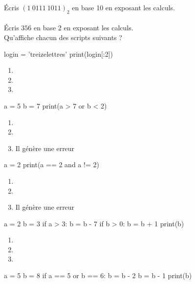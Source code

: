 \documentclass[a4paper,10pt]{article}
\begin{document}
\'Ecris $(1\ 0111\ 1011)_2$ en base 10 en exposant les calculs.\\

\\

\'Ecris $356$ en base 2 en exposant les calculs.\\

\newpage
Qu'affiche chacun des scripts suivants ?\\
\begin{multicols}{2}
\begin{pythoncode}
login = 'treizelettres'
print(login[:2])
\end{pythoncode}
\begin{enumerate}[\case\ \ a.]
\item {}
\item {}
\item {}
\end{enumerate}

\begin{pythoncode}
a = 5
b = 7
print(a > 7 or b < 2)
\end{pythoncode}
\begin{enumerate}[\case\ \ a.]
\item 	{}
\item 	{}
\item 	Il génère une erreur
\end{enumerate}
\begin{pythoncode}
a = 2
print(a == 2 and a != 2)
\end{pythoncode}
\begin{enumerate}[\case\ \ a.]
\item 	{}
\item 	{}
\item 	Il génère une erreur
\end{enumerate}

\begin{pythoncode}
a = 2
b = 3
if a > 3:
    b = b - 7
if b > 0:
    b = b + 1
print(b)
\end{pythoncode}
\begin{enumerate}[\case\ \ a.]
\item 	{}
\item 	{}
\item 	{}
\end{enumerate}
\columnbreak
\begin{pythoncode}
a = 5
b = 8
if a == 5 or b == 6:
    b = b - 2
b = b - 1
print(b)
\end{pythoncode}


\end{multicols}
\end{document}
